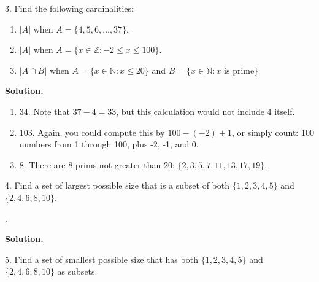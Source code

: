 \documentclass[12pt,]{book}
\theoremstyle{plain}
\theoremstyle{definition}
\theoremstyle{definition}
\theoremstyle{definition}
\numberwithin{equation}{chapter}
\newcommand{\N}{\mathbb N}
\newcommand{\Z}{\mathbb Z}
\newcommand{\st}{:}
\begin{document}
\begin{exerciselist}
\begin{enumerate}[label=(\alph*)]
\end{enumerate}
%
\par
\item[3.]\hypertarget{exercise-68}{}\noindent%
\hypertarget{p-630}{}%
Find the following cardinalities: \leavevmode%
\begin{enumerate}[label=(\alph*)]
\item\hypertarget{li-293}{}\hypertarget{p-631}{}%
\(|A|\) when \(A = \{4,5,6,\ldots,37\}\).   \framebox[5em]{\raisebox{1ex}{}}%
\item\hypertarget{li-294}{}\hypertarget{p-632}{}%
\(|A|\) when \(A = \{x \in \Z \st -2 \le x \le 100\}\).   \framebox[5em]{\raisebox{1ex}{}}%
\item\hypertarget{li-295}{}\hypertarget{p-633}{}%
\(|A \cap B|\) when \(A = \{x \in \N \st x \le 20\}\) and \(B = \{x \in \N \st x \mbox{ is prime} \}\)  \framebox[5em]{\raisebox{1ex}{}}%
\end{enumerate}
%
\par
\medskip\noindent%
\textbf{Solution.}\quad \hypertarget{p-634}{}%
\leavevmode%
\begin{enumerate}[label=(\alph*)]
\item\hypertarget{li-296}{}\hypertarget{p-635}{}%
34. Note that \(37-4 = 33\), but this calculation would not include 4 itself.%
\item\hypertarget{li-297}{}\hypertarget{p-636}{}%
103. Again, you could compute this by \(100-(-2)+1\), or simply count: 100 numbers from 1 through 100, plus -2, -1, and 0.%
\item\hypertarget{li-298}{}\hypertarget{p-637}{}%
8. There are 8 prims not greater than 20: \(\{2, 3, 5, 7, 11, 13, 17, 19\}\).%
\end{enumerate}
%
\par
\item[4.]\hypertarget{exercise-69}{}\noindent%
\hypertarget{p-638}{}%
Find a set of largest possible size that is a subset of both \(\{1, 2, 3, 4, 5\}\) and \(\{2, 4, 6, 8,10\}\).%
\par
\hypertarget{p-639}{}%
 \framebox[15em]{\raisebox{1ex}{}}.%
\par
\medskip\noindent%
\textbf{Solution.}\quad \hypertarget{p-640}{}%
%
\par
\item[5.]\hypertarget{exercise-70}{}\noindent%
\hypertarget{p-641}{}%
Find a set of smallest possible size that has both \(\{1,2,3,4,5\}\) and \(\{2,4,6,8,10\}\) as subsets.%
\par
\hypertarget{p-642}{}%
 \framebox[15em]{\raisebox{1ex}{}}%

\end{exerciselist}
\end{document}
